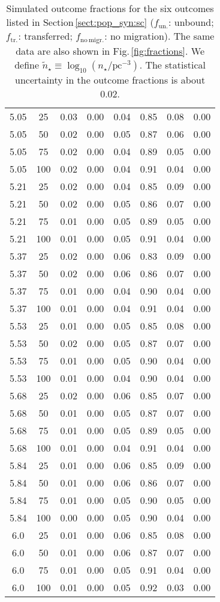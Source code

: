 \documentclass[iop,usenatbib]{emulateapj}
\renewcommand{\S}{Section}
\newcommand{\F}{Fig.}
\begin{document}
\begin{table}
{\begin{tabular}{cccccccc}
5.05 & 25 & 0.03 & 0.00 & 0.04 & 0.85 & 0.08 & 0.00 \\
5.05 & 50 & 0.02 & 0.00 & 0.05 & 0.87 & 0.06 & 0.00 \\
5.05 & 75 & 0.02 & 0.00 & 0.04 & 0.89 & 0.05 & 0.00 \\
5.05 & 100 & 0.02 & 0.00 & 0.04 & 0.91 & 0.04 & 0.00 \\
5.21 & 25 & 0.02 & 0.00 & 0.04 & 0.85 & 0.09 & 0.00 \\
5.21 & 50 & 0.02 & 0.00 & 0.05 & 0.86 & 0.07 & 0.00 \\
5.21 & 75 & 0.01 & 0.00 & 0.05 & 0.89 & 0.05 & 0.00 \\
5.21 & 100 & 0.01 & 0.00 & 0.05 & 0.91 & 0.04 & 0.00 \\
5.37 & 25 & 0.02 & 0.00 & 0.06 & 0.83 & 0.09 & 0.00 \\
5.37 & 50 & 0.02 & 0.00 & 0.06 & 0.86 & 0.07 & 0.00 \\
5.37 & 75 & 0.01 & 0.00 & 0.04 & 0.90 & 0.04 & 0.00 \\
5.37 & 100 & 0.01 & 0.00 & 0.04 & 0.91 & 0.04 & 0.00 \\
5.53 & 25 & 0.01 & 0.00 & 0.05 & 0.85 & 0.08 & 0.00 \\
5.53 & 50 & 0.02 & 0.00 & 0.05 & 0.87 & 0.07 & 0.00 \\
5.53 & 75 & 0.01 & 0.00 & 0.05 & 0.90 & 0.04 & 0.00 \\
5.53 & 100 & 0.01 & 0.00 & 0.04 & 0.90 & 0.04 & 0.00 \\
5.68 & 25 & 0.02 & 0.00 & 0.06 & 0.85 & 0.07 & 0.00 \\
5.68 & 50 & 0.01 & 0.00 & 0.05 & 0.87 & 0.07 & 0.00 \\
5.68 & 75 & 0.01 & 0.00 & 0.05 & 0.89 & 0.05 & 0.00 \\
5.68 & 100 & 0.01 & 0.00 & 0.04 & 0.91 & 0.04 & 0.00 \\
5.84 & 25 & 0.01 & 0.00 & 0.06 & 0.85 & 0.09 & 0.00 \\
5.84 & 50 & 0.01 & 0.00 & 0.06 & 0.86 & 0.07 & 0.00 \\
5.84 & 75 & 0.01 & 0.00 & 0.05 & 0.90 & 0.05 & 0.00 \\
5.84 & 100 & 0.00 & 0.00 & 0.05 & 0.90 & 0.04 & 0.00 \\
6.0 & 25 & 0.01 & 0.00 & 0.06 & 0.85 & 0.08 & 0.00 \\
6.0 & 50 & 0.01 & 0.00 & 0.06 & 0.87 & 0.07 & 0.00 \\
6.0 & 75 & 0.01 & 0.00 & 0.05 & 0.91 & 0.04 & 0.00 \\
6.0 & 100 & 0.01 & 0.00 & 0.05 & 0.92 & 0.03 & 0.00 \\
\bottomrule
\end{tabular}
}
\caption{ Simulated outcome fractions for the six outcomes listed in \S\,\ref{sect:pop_syn:sc} ($f_\mathrm{un.}$: unbound; $f_\mathrm{tr.}$: transferred; $f_\mathrm{no\,migr.}$: no migration). The same data are also shown in \F\,\ref{fig:fractions}. We define $\tilde{n}_\star \equiv \log_{10}(n_\star/\mathrm{pc^{-3}})$. The statistical uncertainty in the outcome fractions is about 0.02.}
\label{table:outcomes}
\end{table}
\end{document}
